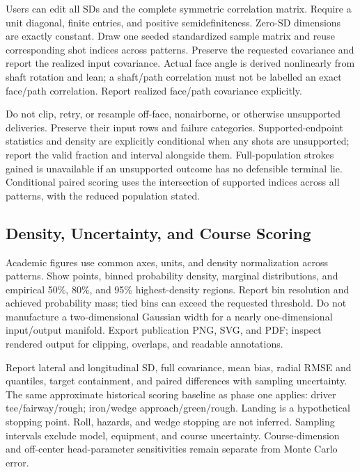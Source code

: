 \documentclass[
]{article}
\begin{document}
Users can edit all SDs and the complete symmetric correlation matrix.
Require a unit diagonal, finite entries, and positive semidefiniteness.
Zero-SD dimensions are exactly constant. Draw one seeded standardized
sample matrix and reuse corresponding shot indices across patterns.
Preserve the requested covariance and report the realized input
covariance. Actual face angle is derived nonlinearly from shaft rotation
and lean; a shaft/path correlation must not be labelled an exact
face/path correlation. Report realized face/path covariance explicitly.

Do not clip, retry, or resample off-face, nonairborne, or otherwise
unsupported deliveries. Preserve their input rows and failure
categories. Supported-endpoint statistics and density are explicitly
conditional when any shots are unsupported; report the valid fraction
and interval alongside them. Full-population strokes gained is
unavailable if an unsupported outcome has no defensible terminal lie.
Conditional paired scoring uses the intersection of supported indices
across all patterns, with the reduced population stated.

\subsection{Density, Uncertainty, and Course
Scoring}\label{density-uncertainty-and-course-scoring}

Academic figures use common axes, units, and density normalization
across patterns. Show points, binned probability density, marginal
distributions, and empirical 50\%, 80\%, and 95\% highest-density
regions. Report bin resolution and achieved probability mass; tied bins
can exceed the requested threshold. Do not manufacture a two-dimensional
Gaussian width for a nearly one-dimensional input/output manifold.
Export publication PNG, SVG, and PDF; inspect rendered output for
clipping, overlaps, and readable annotations.

Report lateral and longitudinal SD, full covariance, mean bias, radial
RMSE and quantiles, target containment, and paired differences with
sampling uncertainty. The same approximate historical scoring baseline
as phase one applies: driver tee/fairway/rough; iron/wedge
approach/green/rough. Landing is a hypothetical stopping point. Roll,
hazards, and wedge stopping are not inferred. Sampling intervals exclude
model, equipment, and course uncertainty. Course-dimension and
off-center head-parameter sensitivities remain separate from Monte Carlo
error.
\end{document}
